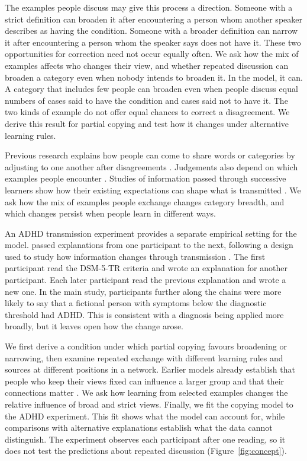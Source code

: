 \documentclass[11pt]{article}
\begin{document}
The examples people discuss may give this process a direction. Someone with a strict definition can broaden it after encountering a person whom another speaker describes as having the condition. Someone with a broader definition can narrow it after encountering a person whom the speaker says does not have it. These two opportunities for correction need not occur equally often. We ask how the mix of examples affects who changes their view, and whether repeated discussion can broaden a category even when nobody intends to broaden it. In the model, it can. A category that includes few people can broaden even when people discuss equal numbers of cases said to have the condition and cases said not to have it. The two kinds of example do not offer equal chances to correct a disagreement. We derive this result for partial copying and test how it changes under alternative learning rules.

Previous research explains how people can come to share words or categories by adjusting to one another after disagreements \citep{steels1995,baronchelli2006,puglisi2008,centola2015}. Judgements also depend on which examples people encounter \citep{parducci1965,levari2018}. Studies of information passed through successive learners show how their existing expectations can shape what is transmitted \citep{griffiths2007,kalish2007}. We ask how the mix of examples people exchange changes category breadth, and which changes persist when people learn in different ways.

An ADHD transmission experiment provides a separate empirical setting for the model. \citet{katiyar2026} passed explanations from one participant to the next, following a design used to study how information changes through transmission \citep{bartlett1932,mesoudi2008}. The first participant read the DSM-5-TR criteria \citep{dsm5tr} and wrote an explanation for another participant. Each later participant read the previous explanation and wrote a new one. In the main study, participants further along the chains were more likely to say that a fictional person with symptoms below the diagnostic threshold had ADHD. This is consistent with a diagnosis being applied more broadly, but it leaves open how the change arose.

We first derive a condition under which partial copying favours broadening or narrowing, then examine repeated exchange with different learning rules and sources at different positions in a network. Earlier models already establish that people who keep their views fixed can influence a larger group and that their connections matter \citep{mobilia2003,mobilia2007,xie2011,centola2018,acemoglu2013,yildiz2013,hunter2022}. We ask how learning from selected examples changes the relative influence of broad and strict views. Finally, we fit the copying model to the ADHD experiment. This fit shows what the model can account for, while comparisons with alternative explanations establish what the data cannot distinguish. The experiment observes each participant after one reading, so it does not test the predictions about repeated discussion (Figure~\ref{fig:concept}).
\end{document}

